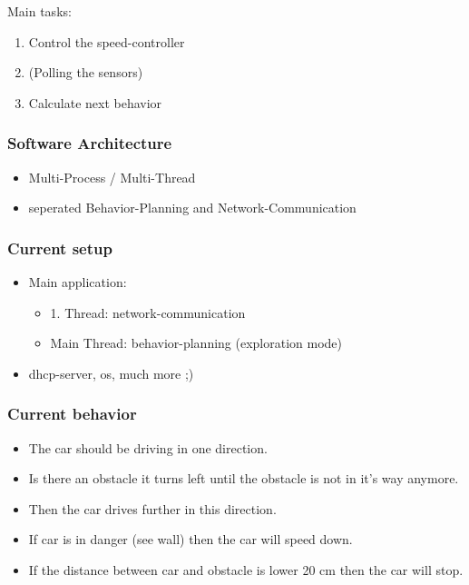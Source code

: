Main tasks:
\begin{enumerate}
	\item Control the speed-controller
	\item (Polling the sensors)
	\item Calculate next behavior
\end{enumerate}

\subsubsection{Software Architecture}

\begin{itemize}
	\item Multi-Process / Multi-Thread
	\item seperated Behavior-Planning and Network-Communication
\end{itemize}

\subsubsection{Current setup}

\begin{itemize}
	\item Main application: 
	\begin{itemize}
		\item 1. Thread: network-communication
		\item Main Thread: behavior-planning (exploration mode)
	\end{itemize}		 
	\item dhcp-server, os, much more ;)
\end{itemize}

\subsubsection{Current behavior}

\begin{itemize}
	\item The car should be driving in one direction. 
	\item Is there an obstacle it turns left until the obstacle is not in it's way anymore. 
	\item Then the car drives further in this direction.
	\item If car is in danger (see wall) then the car will speed down.
	\item If the distance between car and obstacle is lower 20 cm then the car will stop.
\end{itemize}

